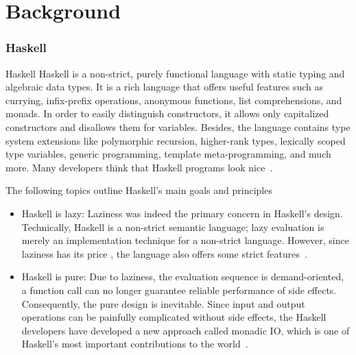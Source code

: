 \section{Background}

\begin{frame}\frametitle{Haskell}

    \footnotesize
    \begin{block}{Haskell}
        Haskell is a non-strict, purely functional language with static typing and algebraic data types. It is a rich language that offers useful features such as currying, infix-prefix operations, anonymous functions, list comprehensions, and monads. In order to easily distinguish constructors, it allows only capitalized constructors and disallows them for variables. Besides, the language contains type system extensions like polymorphic recursion, higher-rank types, lexically scoped type variables, generic programming, template meta-programming,  and much more. Many developers think that Haskell programs look nice~\cite{history-of-haskell}.
    \end{block}

    \begin{block}{The following topics outline Haskell's main goals and principles}
    
        \begin{itemize}
            \item Haskell is lazy: 
            Laziness was indeed the primary concern in Haskell's design. Technically, Haskell is a non-strict semantic language; lazy evaluation is merely an implementation technique for a non-strict language.  However, since laziness has its price 
            , the language also offers some strict features~\cite{history-of-haskell}.
    
            \item Haskell is pure: Due to laziness, the evaluation sequence is demand-oriented, a function call can no longer guarantee reliable performance of side effects. Consequently, the pure design is inevitable. Since input and output operations can be painfully complicated without side effects, the Haskell developers have developed a new approach called monadic IO, which is one of Haskell's most important contributions to the world~\cite{history-of-haskell}.
        \end{itemize}

    \end{block}

\end{frame}

